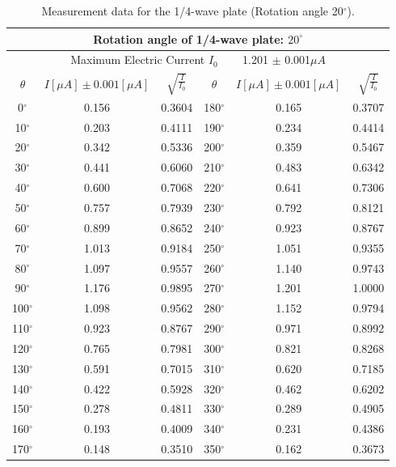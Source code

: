 \documentclass[a4paper,12pt]{article}
\begin{document}
\begin{table}[h]
\begin{center}
\begin{tabular}{|c|c|c||c|c|c|}
\hline
\multicolumn{6}{|c|}{Rotation angle of 1/4-wave plate: $20^{\circ}$}\\
\hline 
\multicolumn{6}{|c|}{Maximum Electric Current $I_0$ ~~~ 1.201 $\pm$ 0.001$\mu A$}\\
\hline 
$\theta$ & $I [\mu A] \pm 0.001 [\mu A]$ & $\sqrt{\frac{I}{I_0}}$ & $\theta$ & $I [\mu A] \pm 0.001 [\mu A]$ & $\sqrt{\frac{I}{I_0}}$ \\
\hline
0$^{\circ}$ & 0.156 & 0.3604 & 180$^{\circ}$ & 0.165 & 0.3707 \\
\hline 
10$^{\circ}$ & 0.203 & 0.4111 & 190$^{\circ}$ & 0.234 & 0.4414\\
\hline
20$^{\circ}$ & 0.342 & 0.5336 & 200$^{\circ}$ & 0.359 & 0.5467\\
\hline
30$^{\circ}$ & 0.441 & 0.6060 & 210$^{\circ}$ & 0.483 & 0.6342\\
\hline
40$^{\circ}$ & 0.600 & 0.7068 & 220$^{\circ}$ & 0.641 & 0.7306\\
\hline
50$^{\circ}$ & 0.757 & 0.7939 & 230$^{\circ}$ & 0.792 & 0.8121\\
\hline
60$^{\circ}$ & 0.899 & 0.8652 & 240$^{\circ}$ & 0.923 & 0.8767\\
\hline
70$^{\circ}$ & 1.013 & 0.9184 & 250$^{\circ}$ & 1.051 & 0.9355\\
\hline
80$^{\circ}$ & 1.097 & 0.9557 & 260$^{\circ}$ & 1.140 & 0.9743\\
\hline
90$^{\circ}$ & 1.176 & 0.9895 & 270$^{\circ}$ & 1.201 & 1.0000\\
\hline
100$^{\circ}$ & 1.098 & 0.9562 & 280$^{\circ}$ & 1.152 & 0.9794\\
\hline
110$^{\circ}$ & 0.923 & 0.8767 & 290$^{\circ}$ & 0.971 & 0.8992\\
\hline
120$^{\circ}$ & 0.765 & 0.7981 & 300$^{\circ}$ & 0.821 & 0.8268\\
\hline
130$^{\circ}$ & 0.591 & 0.7015 & 310$^{\circ}$ & 0.620 & 0.7185\\
\hline
140$^{\circ}$ & 0.422 & 0.5928 & 320$^{\circ}$ & 0.462 & 0.6202\\
\hline
150$^{\circ}$ & 0.278 & 0.4811 & 330$^{\circ}$ & 0.289 & 0.4905\\
\hline
160$^{\circ}$ & 0.193 & 0.4009 & 340$^{\circ}$ & 0.231 & 0.4386\\
\hline
170$^{\circ}$ & 0.148 & 0.3510 & 350$^{\circ}$ & 0.162 & 0.3673\\
\hline
\end{tabular}
\caption{Measurement data for the 1/4-wave plate (Rotation angle 20$^{\circ}$).}
\end{center}
\end{table}
\end{document}
